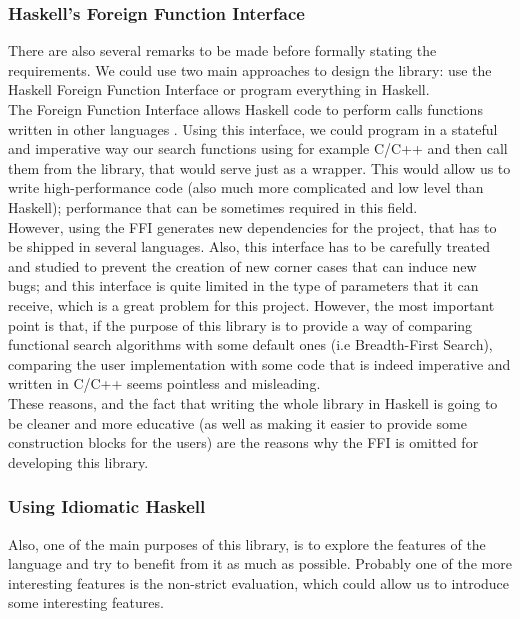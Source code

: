 \subsubsection{Haskell's Foreign Function Interface}

There are also several remarks to be made before formally stating the
requirements. We could use two main approaches to design the library: use the
Haskell Foreign Function Interface or program everything in Haskell.\\

The Foreign Function Interface allows Haskell code to perform calls functions
written in other languages \cite{haskell98-ffi}. Using this interface, we could
program in a stateful and imperative way our search functions using for example
C/C++ and then call them from the library, that would serve just as a wrapper.
This would allow us to write high-performance code (also much more complicated
and low level than Haskell); performance that can be sometimes required in
this field.\\

However, using the FFI generates new dependencies for the project, that has to
be shipped in several languages. Also, this interface has to be carefully
treated and studied to prevent the creation of new corner cases that can induce
new bugs; and this interface is quite limited in the type of parameters that it
can receive, which is a great problem for this project. However, the most
important point is that, if the purpose of this library is to provide a way of
comparing functional search algorithms with some default ones (i.e
Breadth-First Search), comparing the user implementation with some code that is
indeed imperative and written in C/C++ seems pointless and misleading.\\

These reasons, and the fact that writing the whole library in Haskell is going
to be cleaner and more educative (as well as making it easier to provide some
construction blocks for the users) are the reasons why the FFI is omitted for
developing this library.\\

\subsubsection{Using Idiomatic Haskell}

Also, one of the main purposes of this library, is to explore the features of
the language and try to benefit from it as much as possible. Probably one of
the more interesting features is the non-strict evaluation, which could allow
us to introduce some interesting features.\\


